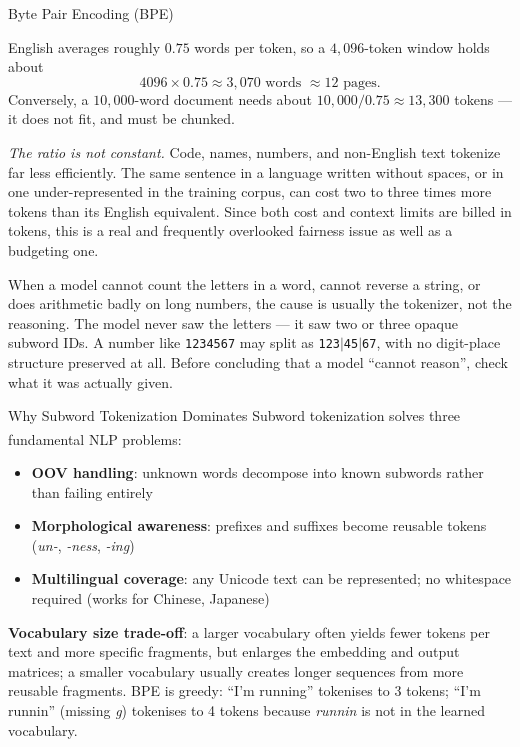 \begin{v3topic}{Byte Pair Encoding (BPE)}
\begin{workedexample}
English averages roughly $0.75$ words per token, so a $4{,}096$-token window
holds about
\[
  4096 \times 0.75 \approx 3{,}070 \text{ words } \approx 12 \text{ pages.}
\]
Conversely, a $10{,}000$-word document needs about
$10{,}000 / 0.75 \approx 13{,}300$ tokens --- it does not fit, and must be
chunked.

\emph{The ratio is not constant.} Code, names, numbers, and non-English text
tokenize far less efficiently. The same sentence in a language written without
spaces, or in one under-represented in the training corpus, can cost two to
three times more tokens than its English equivalent. Since both cost and
context limits are billed in tokens, this is a real and frequently overlooked
fairness issue as well as a budgeting one.
\end{workedexample}

\begin{cautionbox}
When a model cannot count the letters in a word, cannot reverse a string, or
does arithmetic badly on long numbers, the cause is usually the tokenizer, not
the reasoning. The model never saw the letters --- it saw two or three opaque
subword IDs. A number like \texttt{1234567} may split as
\texttt{123}$\vert$\texttt{45}$\vert$\texttt{67}, with no digit-place structure
preserved at all. Before concluding that a model ``cannot reason'', check what
it was actually given.
\end{cautionbox}
\begin{v3topic}{Why Subword Tokenization Dominates}
    Subword tokenization solves three fundamental NLP problems\textsuperscript{\cite[][pp.~15--16]{farrisHowLargeLanguage2025}}:
    \begin{itemize}
        \item \textbf{OOV handling}: unknown words decompose into known subwords rather than failing entirely
        \item \textbf{Morphological awareness}: prefixes and suffixes become reusable tokens (\emph{un-}, \emph{-ness}, \emph{-ing})
        \item \textbf{Multilingual coverage}: any Unicode text can be represented; no whitespace required (works for Chinese, Japanese)
    \end{itemize}
    \textbf{Vocabulary size trade-off}: a larger vocabulary often yields fewer tokens per text and more specific fragments, but enlarges the embedding and output matrices; a smaller vocabulary usually creates longer sequences from more reusable fragments.
    BPE is greedy: ``I'm running'' tokenises to 3 tokens; ``I'm runnin'' (missing \emph{g}) tokenises to 4 tokens because \emph{runnin} is not in the learned vocabulary.
\end{v3topic}


\end{v3topic}
